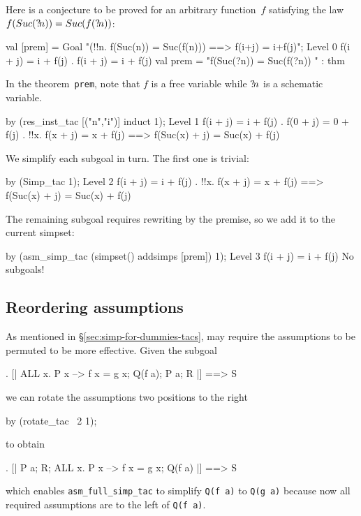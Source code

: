 Here is a conjecture to be proved for an arbitrary function~$f$
satisfying the law $f(Suc({?\!n})) = Suc(f({?\!n}))$:
\begin{ttbox}
val [prem] = Goal
               "(!!n. f(Suc(n)) = Suc(f(n))) ==> f(i+j) = i+f(j)";
{\out Level 0}
{\out f(i + j) = i + f(j)}
{. f(i + j) = i + f(j)}
\ttbreak
{\out val prem = "f(Suc(?n)) = Suc(f(?n))}
{\out             [!!n. f(Suc(n)) = Suc(f(n))]" : thm}
\end{ttbox}
In the theorem~\texttt{prem}, note that $f$ is a free variable while
${?\!n}$ is a schematic variable.
\begin{ttbox}
by (res_inst_tac [("n","i")] induct 1);
{\out Level 1}
{\out f(i + j) = i + f(j)}
{. f(0 + j) = 0 + f(j)}
{. !!x. f(x + j) = x + f(j) ==> f(Suc(x) + j) = Suc(x) + f(j)}
\end{ttbox}
We simplify each subgoal in turn.  The first one is trivial:
\begin{ttbox}
by (Simp_tac 1);
{\out Level 2}
{\out f(i + j) = i + f(j)}
{. !!x. f(x + j) = x + f(j) ==> f(Suc(x) + j) = Suc(x) + f(j)}
\end{ttbox}
The remaining subgoal requires rewriting by the premise, so we add it
to the current simpset:
\begin{ttbox}
by (asm_simp_tac (simpset() addsimps [prem]) 1);
{\out Level 3}
{\out f(i + j) = i + f(j)}
{\out No subgoals!}
\end{ttbox}

\subsection{Reordering assumptions}
\label{sec:reordering-asms}

As mentioned in \S\ref{sec:simp-for-dummies-tacs},
 may require the assumptions to be permuted
to be more effective.  Given the subgoal
\begin{ttbox}
{. [| ALL x. P x --> f x = g x; Q(f a); P a; R |] ==> S}
\end{ttbox}
we can rotate the assumptions two positions to the right
\begin{ttbox}
by (rotate_tac ~2 1);
\end{ttbox}
to obtain
\begin{ttbox}
{. [| P a; R; ALL x. P x --> f x = g x; Q(f a) |] ==> S}
\end{ttbox}
which enables \verb$asm_full_simp_tac$ to simplify \verb$Q(f a)$ to
\verb$Q(g a)$ because now all required assumptions are to the left of
\verb$Q(f a)$.

